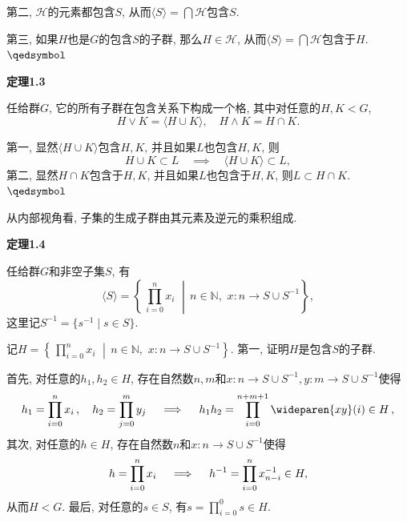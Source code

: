 \documentclass[UTF8]{ctexart}
\begin{document}
第二, $\mathcal{H}$的元素都包含$S$,
从而$\displaystyle\langle S\rangle=\bigcap\mathcal{H}$包含$S$.

第三, 如果$H$也是$G$的包含$S$的子群, 那么$H\in\mathcal{H}$,
从而$\displaystyle\langle S\rangle=\bigcap\mathcal{H}$包含于$H$.
\hfill $\qedsymbol$

\vspace{10pt}

\hypertarget{sec:定理1.3}{}
\noindent\textbf{定理1.3}

任给群$G$, 它的所有子群在包含关系下构成一个格, 其中对任意的$H,K<G$,
\[
    H\lor K=\langle H\cup K\rangle,\quad H\land K=H\cap K.
\]


第一, 显然$\langle H\cup K\rangle$包含$H,K$, 并且如果$L$也包含$H,K$, 则
\[
    H\cup K\subset L\quad\implies\quad\langle H\cup K\rangle\subset L,
\]
第二, 显然$H\cap K$包含于$H,K$, 并且如果$L$也包含于$H,K$, 则$L\subset H\cap K$.
\hfill $\qedsymbol$





\newpage

从内部视角看, 子集的生成子群由其元素及逆元的乘积组成.

\vspace{10pt}

\hypertarget{sec:定理1.4}{}
\noindent\textbf{定理1.4}

任给群$G$和非空子集$S$, 有
\[
    \langle S\rangle=\left\{\,\prod_{i=0}^nx_i\,\,\middle\vert\,
    n\in\mathbb{N},\,\,x:n\to S\cup S^{-1}\right\},
\]
这里记$S^{-1}=\{s^{-1}\mid s\in S\}$.


记$H=\displaystyle\left\{\,\prod_{i=0}^nx_i\,\,\middle\vert\,
n\in\mathbb{N},\,\,x:n\to S\cup S^{-1}\right\}$.
第一, 证明$H$是包含$S$的子群.

\vspace{6pt}
首先, 对任意的$h_1,h_2\in H$, 存在自然数$n,m$和$x:n\to S\cup S^{-1},
y:m\to S\cup S^{-1}$使得
\vspace{3pt}
\[
    h_1=\prod_{i=0}^nx_i\,,\quad h_2=\prod_{j=0}^my_j\quad\implies\quad
    h_1h_2=\prod_{i=0}^{n+m+1}\wideparen{xy}(i)\in H\,,\\[3pt]
\]
其次, 对任意的$h\in H$, 存在自然数$n$和$x:n\to S\cup S^{-1}$使得
\vspace{3pt}
\[
    h=\prod_{i=0}^nx_i\quad\implies\quad
    h^{-1}=\prod_{i=0}^nx_{n-i}^{-1}\in H,\\[3pt]
\]
从而$H<G$. 最后, 对任意的$s\in S$, 有$\displaystyle
s=\prod_{i=0}^0s\in H$.
\end{document}
